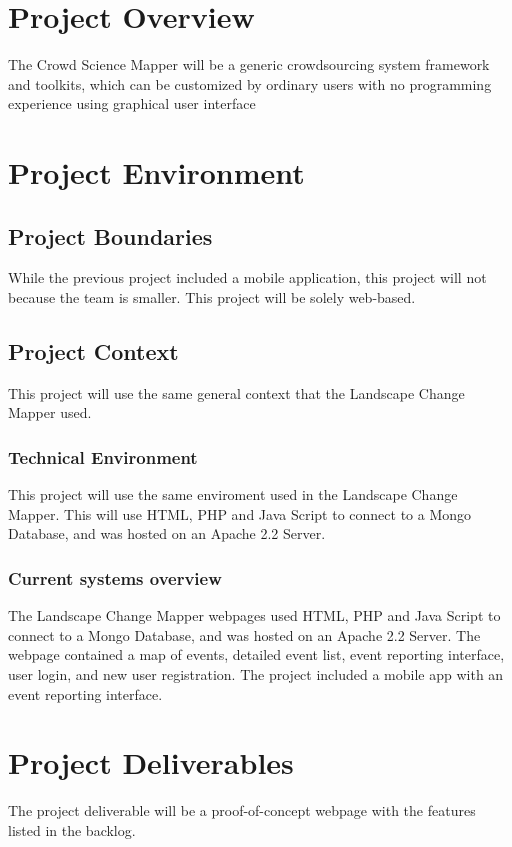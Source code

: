 \section{Project Overview}
The Crowd Science Mapper will be a generic crowdsourcing system framework and toolkits, which can be customized by ordinary users with no programming experience using graphical user interface
\section{Project Environment}
\subsection{Project Boundaries}
While the previous project included a mobile application, this project will not because the team is smaller. This project will be solely web-based. 
\subsection{Project Context}
This project will use the same general context that the Landscape Change Mapper used.  
\subsubsection{Technical Environment}
This project will use the same enviroment used in the Landscape Change Mapper. This will use HTML, PHP and Java Script to connect to a Mongo Database, and was hosted on an Apache 2.2 Server.
\subsubsection{Current systems overview}
The Landscape Change Mapper webpages used HTML, PHP and Java Script to connect to a Mongo Database, and was hosted on an Apache 2.2 Server. The webpage contained a map of events, detailed event list, event reporting interface, user login, and new user registration. The project included a mobile app with an event reporting interface. 
\section{Project Deliverables}
The project deliverable will be a proof-of-concept webpage with the features listed in the backlog.
